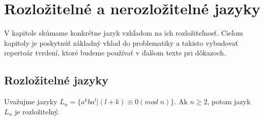 \chapter[Rozložitelné a nerozložitelné jazyky]{Rozložitelné a nerozložitelné jazyky}
\label{kap:languages}

V kapitole skúmame konkrétne jazyk vzhľadom na ich rozložiteľnosť. Cieľom kapitoly je poskytnúť základný vhlad do problematiky a takisto vybudovať repertoár tvrdení, ktoré budeme používať v ďalšom texte pri dôkazoch.

\section{Rozložitelné jazyky}

\begin{proposition}
Uvažujme jazyky $ L_{n} = \lbrace a^{k}ba^{l} | (l+k) \equiv 0 (mod \; n) \rbrace $. Ak $ n \geq 2 $, potom jazyk $ L_n $ je rozložiteľný.
\end{proposition}

